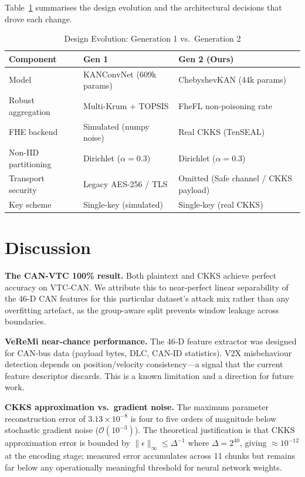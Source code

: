 \documentclass[conference]{IEEEtran}
\begin{document}
Table~\ref{tab:evolution} summarises the design evolution and the
architectural decisions that drove each change.

\begin{table}[!t]
\centering
\caption{Design Evolution: Generation 1 vs.\ Generation 2}
\label{tab:evolution}
\begin{tabular}{@{}lll@{}}
\toprule
\textbf{Component} & \textbf{Gen 1} & \textbf{Gen 2 (Ours)} \\
\midrule
Model & KANConvNet (609k params) & ChebyshevKAN (44k params) \\
Robust aggregation & Multi-Krum + TOPSIS & FheFL non-poisoning rate \\
FHE backend & Simulated (numpy noise) & Real CKKS (TenSEAL) \\
Non-IID partitioning & Dirichlet ($\alpha{=}0.3$) & Dirichlet ($\alpha{=}0.3$) \\
Transport security & Legacy AES-256 / TLS & Omitted (Safe channel / CKKS payload) \\
Key scheme & Single-key (simulated) & Single-key (real CKKS) \\
\bottomrule
\end{tabular}
\end{table}

\section{Discussion}

\textbf{The CAN-VTC 100\% result.}
Both plaintext and CKKS achieve perfect accuracy on VTC-CAN. We attribute
this to near-perfect linear separability of the 46-D CAN features for this
particular dataset's attack mix rather than any overfitting artefact,
as the group-aware split prevents window leakage across boundaries.

\textbf{VeReMi near-chance performance.}
The 46-D feature extractor was designed for CAN-bus data (payload bytes,
DLC, CAN-ID statistics). V2X misbehaviour detection depends on
position/velocity consistency---a signal that the current feature descriptor
discards. This is a known limitation and a direction for future work.

\textbf{CKKS approximation vs.\ gradient noise.}
The maximum parameter reconstruction error of $3.13 \times 10^{-8}$ is
four to five orders of magnitude below stochastic gradient noise
($\mathcal{O}(10^{-3})$). The theoretical justification is that CKKS
approximation error is bounded by $\|\epsilon\|_\infty \le \Delta^{-1}$
where $\Delta = 2^{40}$, giving $\approx 10^{-12}$ at the encoding stage;
measured error accumulates across 11 chunks but remains far below any
operationally meaningful threshold for neural network weights.
\end{document}
